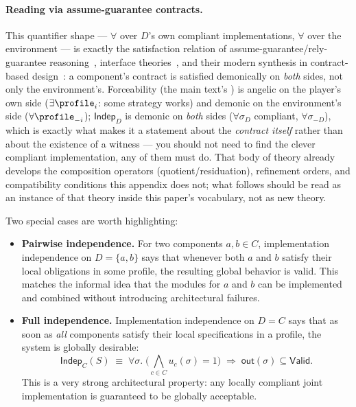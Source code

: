 \paragraph{Reading via assume-guarantee contracts.}
This quantifier shape --- $\forall$ over $D$'s own compliant implementations,
$\forall$ over the environment --- is exactly the satisfaction relation of
assume-guarantee/rely-guarantee
reasoning~\cite{Jones1983RelyGuarantee,AbadiLamport1993ComposingSpecifications},
interface theories~\cite{deAlfaroHenzinger2001InterfaceAutomata}, and their
modern synthesis in contract-based
design~\cite{Benveniste2018ContractsForSystemDesign}: a component's contract
is satisfied demonically on \emph{both} sides, not only the environment's.
Forceability (the main text's ) is angelic on the player's
own side ($\exists\profile_i$: some strategy works) and demonic on the
environment's side ($\forall\profile_{-i}$); $\mathsf{Indep}_D$ is demonic on
\emph{both} sides ($\forall\sigma_D$ compliant, $\forall\sigma_{-D}$), which
is exactly what makes it a statement about the \emph{contract itself} rather
than about the existence of a witness --- you should not need to find the
clever compliant implementation, any of them must do. That body of theory
already develops the composition operators (quotient/residuation), refinement
orders, and compatibility conditions this appendix does not; what follows
should be read as an instance of that theory inside this paper's vocabulary,
not as new theory.

Two special cases are worth highlighting:

\begin{itemize}
  \item \textbf{Pairwise independence.}
  For two components $a,b \in C$, implementation independence on
  $D = \{a,b\}$ says that whenever both $a$ and $b$ satisfy their local
  obligations in some profile, the resulting global behavior is valid.
  This matches the informal idea that the modules for $a$ and $b$ can be
  implemented and combined without introducing architectural failures.

  \item \textbf{Full independence.}
  Implementation independence on $D = C$ says that as soon as
  \emph{all} components satisfy their local specifications in a profile,
  the system is globally desirable:
  \[
    \mathsf{Indep}_C(S)
    \;\equiv\;
    \forall \sigma.\;
      \biggl(
        \bigwedge_{c\in C} u_c(\sigma) = 1
      \biggr)
      \;\Longrightarrow\;
      \mathsf{out}(\sigma) \subseteq \mathsf{Valid}.
  \]
  This is a very strong architectural property:
  any locally compliant joint implementation is guaranteed to be globally
  acceptable.
\end{itemize}

